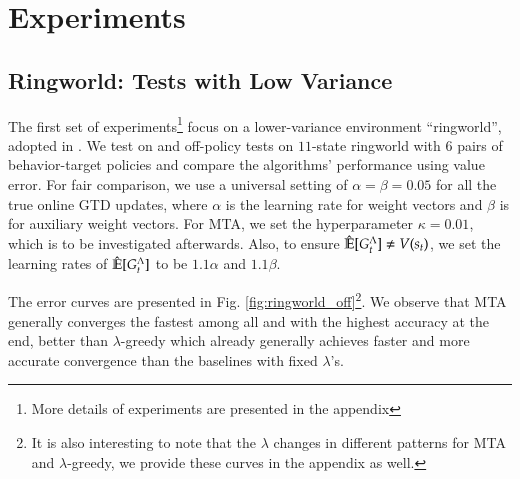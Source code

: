 \documentclass{article}
\begin{document}
\section{Experiments}\label{sec:experiments}
\subsection{Ringworld: Tests with Low Variance}
The first set of experiments\footnote{More details of experiments are presented in the appendix} focus on a lower-variance environment ``ringworld'', adopted in \cite{white2016greedy}. We test on and off-policy tests on $11$-state ringworld with $6$ pairs of behavior-target policies and compare the algorithms' performance using value error. For fair comparison, we use a universal setting of $\alpha = \beta = 0.05$ for all the true online GTD updates, where $\alpha$ is the learning rate for weight vectors and $\beta$ is for auxiliary weight vectors. For MTA, we set the hyperparameter $\kappa = 0.01$, which is to be investigated afterwards. Also, to ensure $\hat{\mathbb{E}}[G_t^\Lambda] \neq V(s_t)$, we set the learning rates of $\hat{\mathbb{E}}[G_t^\Lambda]$ to be $1.1\alpha$ and $1.1\beta$.
\par
The error curves are presented in Fig. \ref{fig:ringworld_off}\footnote{%
It is also interesting to note that the $\lambda$ changes in different patterns for MTA and $\lambda$-greedy, we provide these curves in the appendix as well.}.
We observe that MTA generally converges the fastest among all and with the highest accuracy at the end, better than $\lambda$-greedy which already generally achieves faster and more accurate convergence than the baselines with fixed $\lambda$'s.
\end{document}
